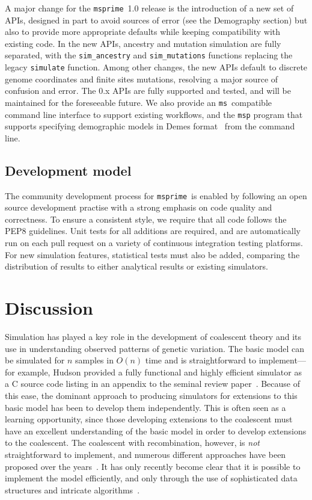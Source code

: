 \documentclass{article}
\newcommand{\msprime}[0]{\texttt{msprime}}
\newcommand{\ms}[0]{\texttt{ms}}
\begin{document}
A major change for the \msprime\ 1.0 release is the introduction of a new set of APIs,
designed in part to avoid sources of error (see the Demography section) but
also to provide more appropriate defaults while keeping compatibility with
existing code. In the new APIs, ancestry and mutation simulation are fully
separated, with the \texttt{sim\_ancestry} and \texttt{sim\_mutations}
functions replacing the legacy \texttt{simulate} function. Among other changes,
the new APIs default to discrete genome coordinates and finite sites mutations,
resolving a major source of confusion and error. The 0.x APIs are fully
supported and tested, and will be maintained for the foreseeable future.
We also provide an \ms\ compatible
command line interface to support existing workflows, and the
\texttt{msp} program that supports specifying demographic models in
Demes format~\citep{gower2021demes} from the command line.


\subsection*{Development model}
The community development process for \msprime\ is enabled by following an
open source development practise with a strong emphasis on code quality
and correctness. To ensure a consistent style, we require that all code
follows the PEP8 guidelines. Unit tests for all additions are required, and
are automatically run on each pull request on a variety of continuous
integration testing platforms. For new simulation features, statistical tests
must also be added, comparing the distribution of results to either analytical
results or existing simulators.

\section*{Discussion}
Simulation has played a key role in the development of coalescent theory
and its use in understanding observed patterns of genetic variation.
The basic model can be simulated for $n$ samples in $O(n)$ time
and is straightforward to implement---for example, Hudson provided a fully
functional and highly efficient simulator as a C source code listing in an
appendix to the seminal review paper~\citep{hudson1990gene}. Because of
this ease, the dominant approach to producing simulators for extensions
to this basic model has been to develop them independently. This is
often seen as a learning opportunity, since those developing extensions
to the coalescent must have an excellent understanding of the basic
model in order to develop extensions to the coalescent.
The coalescent with recombination, however, is \emph{not} straightforward
to implement, and numerous different approaches have been
proposed over the
years~\citep{hudson1983properties,griffiths1997ancestral,wiuf1999recombination,
mcvean2005approximating}. It has only recently become clear that it is
possible to implement the model efficiently, and only through the use
of sophisticated data structures and
intricate algorithms~\citep{kelleher2016efficient}.
\end{document}

